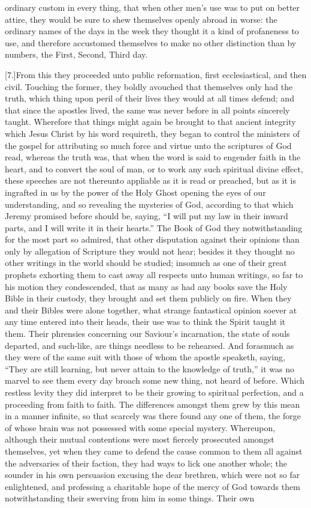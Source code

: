 ordinary custom in every thing, that when other men’s use was to put on better attire, they would be sure to shew themselves openly abroad in worse: the ordinary names of the days in the week they thought it a kind of profaneness to use, and therefore accustomed themselves to make no other distinction than by numbers, the First, Second, Third day.

[7.]From this they proceeded unto public reformation, first ecclesiastical, and then civil. Touching the former, they boldly avouched that themselves only had the truth, which thing upon peril of their lives they would at all times defend; and that since the apostles lived, the same was never before in all points sincerely taught. Wherefore that things might again be brought to that ancient integrity which Jesus Christ by his word requireth, they began to control the ministers of the gospel for attributing so much force and virtue unto the scriptures of God read, whereas the truth was, that when the word is said to engender faith in the heart, and to convert the soul of man, or to work any such spiritual divine effect, these speeches are not thereunto appliable as it is read or preached, but as it is ingrafted in us by the power of the Holy Ghost opening the eyes of our understanding, and so revealing the mysteries of God, according to that which Jeremy promised before should be, saying, “I will put my law in their inward parts, and I will write it in their hearts.” The Book of God they notwithstanding for the most part so admired, that other disputation against their opinions than only by allegation of Scripture they would not hear; besides it they thought no other writings in the world should be studied; insomuch as one of their great prophets exhorting them to cast away all respects unto human writings, so far to his motion they condescended, that as many as had any books save the Holy Bible in their custody, they brought and set them publicly on fire. When they and their Bibles were alone together, what strange fantastical opinion soever at any time entered into their heads, their use was to think the Spirit taught it them. Their phrensies concerning our Saviour’s incarnation, the state of souls departed, and such-like, are things needless to be rehearsed. And forasmuch as they were of the same suit with those of whom the apostle speaketh, saying, “They are still learning, but never attain to the knowledge of truth,” it was no marvel to see them every day broach some new thing, not heard of before. Which restless levity they did interpret to be their growing to spiritual perfection, and a proceeding from faith to faith. The differences amongst them grew by this mean in a manner infinite, so that scarcely was there found any one of them, the forge of whose brain was not possessed with some special mystery. Whereupon, although their mutual contentions were most fiercely prosecuted amongst themselves, yet when they came to defend the cause common to them all against the adversaries of their faction, they had ways to lick one another whole; the sounder in his own persuasion excusing the dear brethren, which were not so far enlightened, and professing a charitable hope of the mercy of God towards them notwithstanding their swerving from him in some things. Their own 